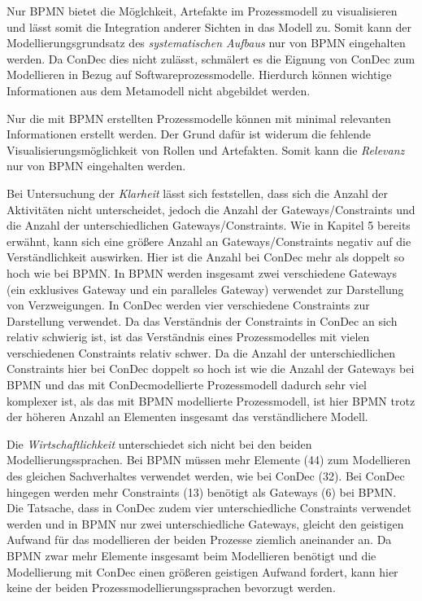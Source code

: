 Nur BPMN bietet die Möglchkeit, Artefakte im Prozessmodell zu visualisieren und lässt somit die Integration anderer Sichten in das Modell zu. Somit kann der Modellierungsgrundsatz des \textit{systematischen Aufbaus} nur von BPMN eingehalten werden. Da ConDec dies nicht zulässt, schmälert es die Eignung von ConDec zum Modellieren in Bezug auf Softwareprozessmodelle. Hierdurch können wichtige Informationen aus dem Metamodell nicht abgebildet werden. \newline 

Nur die mit BPMN erstellten Prozessmodelle können mit minimal relevanten Informationen erstellt werden. Der Grund dafür ist widerum die fehlende Visualisierungsmöglichkeit von Rollen und Artefakten. Somit kann die \textit{Relevanz} nur von BPMN eingehalten werden.\newline




Bei Untersuchung der \textit{Klarheit} lässt sich feststellen, dass sich die Anzahl der Aktivitäten nicht unterscheidet, jedoch die Anzahl der Gateways/Constraints und die Anzahl der unterschiedlichen Gateways/Constraints. Wie in Kapitel 5 bereits erwähnt, kann sich eine größere Anzahl an Gateways/Constraints negativ auf die Verständlichkeit auswirken. Hier ist die Anzahl bei ConDec mehr als doppelt so hoch wie bei BPMN. In BPMN werden insgesamt zwei verschiedene Gateways (ein exklusives Gateway und ein paralleles Gateway) verwendet zur Darstellung von Verzweigungen. In ConDec werden vier verschiedene Constraints zur Darstellung verwendet. Da das Verständnis der Constraints in ConDec an sich relativ schwierig ist, ist das Verständnis eines Prozessmodelles mit vielen verschiedenen Constraints relativ schwer. Da die Anzahl der unterschiedlichen Constraints hier bei ConDec doppelt so hoch ist wie die Anzahl der Gateways bei BPMN und das mit ConDecmodellierte Prozessmodell dadurch sehr viel komplexer ist, als das mit BPMN modellierte Prozessmodell, ist hier BPMN trotz der höheren Anzahl an Elementen insgesamt das verständlichere Modell.\newline

Die \textit{Wirtschaftlichkeit} unterschiedet sich nicht bei den beiden Modellierungssprachen. Bei BPMN müssen mehr Elemente (44) zum Modellieren des gleichen Sachverhaltes verwendet werden, wie bei ConDec (32). Bei ConDec hingegen werden mehr Constraints (13) benötigt als Gateways (6) bei BPMN. Die Tatsache, dass in ConDec zudem vier unterschiedliche Constraints verwendet werden und in BPMN nur zwei unterschiedliche Gateways, gleicht den geistigen Aufwand für das modellieren der beiden Prozesse ziemlich aneinander an. \newline
Da BPMN zwar mehr Elemente insgesamt beim Modellieren benötigt und die Modellierung mit ConDec einen größeren geistigen Aufwand fordert, kann hier keine der beiden Prozessmodellierungssprachen bevorzugt werden.\newline

